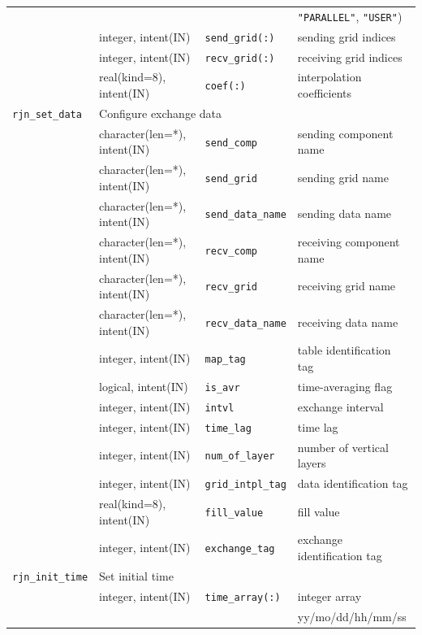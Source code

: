 \documentclass[11pt,a4paper]{report}
\begin{document}
\begin{table}[H]
\begin{center}
{\begin{tabular}{llll}
                &  &  & \texttt{"PARALLEL"}, \texttt{"USER"})\\
                & integer, intent(IN) & \texttt{send\_grid(:)} & sending grid indices\\
                & integer, intent(IN) & \texttt{recv\_grid(:)} & receiving grid indices\\
                & real(kind=8), intent(IN) & \texttt{coef(:)} & interpolation coefficients\\
\hline
 \texttt{rjn\_set\_data} & \multicolumn{3}{l}{Configure exchange data} \\
                & character(len=*), intent(IN) & \texttt{send\_comp} & sending component name\\
                & character(len=*), intent(IN) & \texttt{send\_grid} & sending grid name\\
                & character(len=*), intent(IN) & \texttt{send\_data\_name} & sending data name\\
                & character(len=*), intent(IN) & \texttt{recv\_comp} & receiving component name\\
                & character(len=*), intent(IN) & \texttt{recv\_grid} & receiving grid name\\
                & character(len=*), intent(IN) & \texttt{recv\_data\_name} & receiving data name\\
                & integer, intent(IN) & \texttt{map\_tag} & table identification tag\\
                & logical, intent(IN) & \texttt{is\_avr} & time-averaging flag\\
                & integer, intent(IN) & \texttt{intvl} & exchange interval\\
                & integer, intent(IN) & \texttt{time\_lag} & time lag\\
                & integer, intent(IN) & \texttt{num\_of\_layer} & number of vertical layers\\
                & integer, intent(IN) & \texttt{grid\_intpl\_tag} & data identification tag\\
                & real(kind=8), intent(IN) & \texttt{fill\_value} & fill value\\
                & integer, intent(IN) & \texttt{exchange\_tag} & exchange identification tag\\
\hline
 \texttt{rjn\_init\_time} &  \multicolumn{3}{l}{Set initial time}\\
                & integer, intent(IN) & \texttt{time\_array(:)} & integer array \\
                &                     &                & yy/mo/dd/hh/mm/ss\\
\hline\hline
\end{tabular}
}
\end{center}
\end{table}
\end{document}
